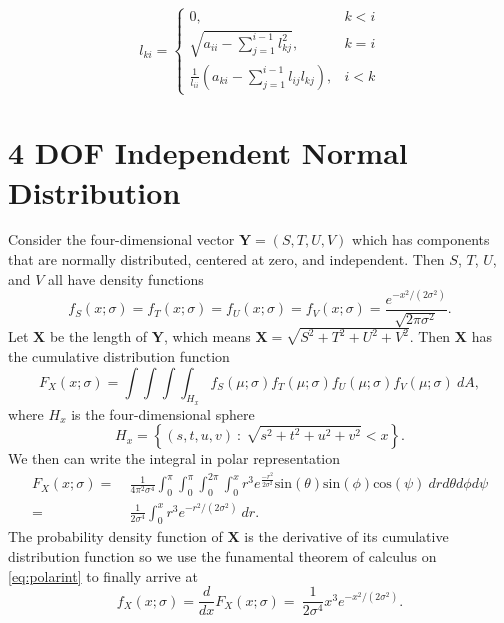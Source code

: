 \[ 
   l_{ki} = 
	 \begin{cases} 
      0, & k < i \\
      \sqrt{a_{ii} - \sum_{j=1}^{i-1}l^2_{kj}}, & k=i \\
      \frac{1}{l_{ii}} (a_{ki} - \sum_{j=1}^{i-1}l_{ij}l_{kj}), & i < k 
   \end{cases}
\]

\section{4 DOF Independent Normal Distribution}
Consider the four-dimensional vector $\textbf{Y} = (S,T,U,V)$ which has components that are normally distributed, centered at zero, and independent. 
Then $S$, $T$, $U$, and $V$ all have density functions
\begin{equation}
f_S(x;\sigma) = f_T(x;\sigma) = f_U(x;\sigma) = f_V(x;\sigma) = \frac{e^{-x^2/(2\sigma^2)}}{\sqrt{2\pi\sigma^2}}.
\label{eq:single_dists}
\end{equation}
Let $\textbf{X}$ be the length of $\textbf{Y}$, which means $\textbf{X} = \sqrt{S^2+T^2+U^2+V^2}$.
Then $\textbf{X}$ has the cumulative distribution function
\begin{equation}
F_X(x;\sigma) = \int \!\!\!\int \!\!\!\int \!\!\!\int_{H_x} \!\!f_S(\mu;\sigma)f_T(\mu;\sigma)f_U(\mu;\sigma)f_V(\mu;\sigma) ~dA,
\label{eq:cumdist}
\end{equation}
where $H_x$ is the four-dimensional sphere
\begin{equation}
H_x = \left\{(s,t,u,v)~:~\sqrt{s^2+t^2+u^2+v^2} < x \right\}.
\label{eq:4dsphere}
\end{equation}
We then can write the integral in polar representation
\begin{align}
F_X(x;\sigma) = & ~\frac{1}{4\pi^2\sigma^4} \!\int_0^\pi \!\!\!\!\int_0^\pi \!\!\!\!\int_0^{2\pi} \!\!\!\!\!\int_0^x \!r^3e^{\frac{-r^2}{2\sigma^2}} \mbox{sin}(\theta) \mbox{sin}(\phi) \mbox{cos}(\psi) ~dr d\theta d\phi d\psi \nonumber \\
= & ~\frac{1}{2\sigma^4} \int_0^x r^3e^{-r^2/(2\sigma^2)} ~dr.
\label{eq:polarint}
\end{align}
The probability density function of $\textbf{X}$ is the derivative of its cumulative distribution function so we use the funamental theorem of calculus on \eqref{eq:polarint} to finally arrive at
\begin{equation}
f_X(x;\sigma) = \frac{d}{dx}F_X(x;\sigma) =  ~\frac{1}{2\sigma^4} x^3e^{-x^2/(2\sigma^2)}.
\label{eq:finaldist}
\end{equation}